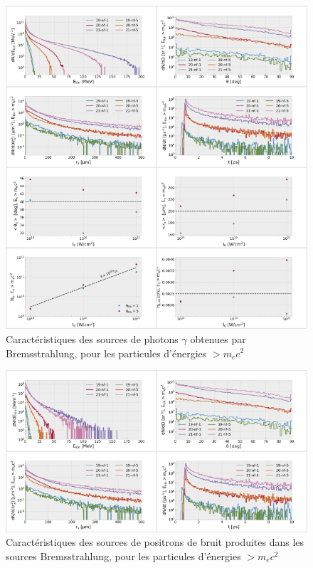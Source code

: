 \begin{figure}[h]
    \centering
    \includegraphics[width=\linewidth]{8-annexes/converter_gamma.png}
    \caption{Caractéristiques des sources de photons $\gamma$ obtenues par Bremsstrahlung, pour les particules d'énergies $>m_e c^2$}
\end{figure}
\newpage
\begin{figure}[h]
    \centering
    \includegraphics[width=\linewidth]{8-annexes/converter_positron.png}
    \caption{Caractéristiques des sources de positrons de bruit produites dans les sources Bremsstrahlung, pour les particules d'énergies $>m_e c^2$}
\end{figure}